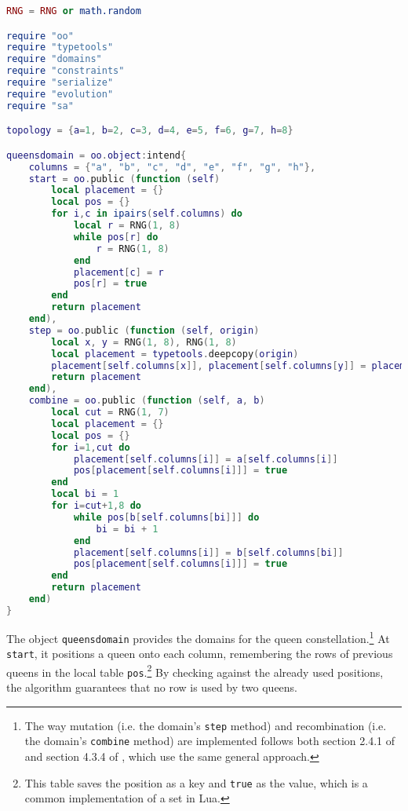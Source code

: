 \begin{appendices}
\begin{lstlisting}[language=lua, caption={The script \texttt{queens} (part 1)}, label=lst:queens1, name=lst:queens]
RNG = RNG or math.random

require "oo"
require "typetools"
require "domains"
require "constraints"
require "serialize"
require "evolution"
require "sa"

topology = {a=1, b=2, c=3, d=4, e=5, f=6, g=7, h=8}

queensdomain = oo.object:intend{
    columns = {"a", "b", "c", "d", "e", "f", "g", "h"},
    start = oo.public (function (self)
        local placement = {}
        local pos = {}
        for i,c in ipairs(self.columns) do
            local r = RNG(1, 8)
            while pos[r] do
                r = RNG(1, 8)
            end
            placement[c] = r
            pos[r] = true
        end
        return placement
    end),
    step = oo.public (function (self, origin)
        local x, y = RNG(1, 8), RNG(1, 8)
        local placement = typetools.deepcopy(origin)
        placement[self.columns[x]], placement[self.columns[y]] = placement[self.columns[y]], placement[self.columns[x]]
        return placement
    end),
    combine = oo.public (function (self, a, b)
        local cut = RNG(1, 7)
        local placement = {}
        local pos = {}
        for i=1,cut do
            placement[self.columns[i]] = a[self.columns[i]]
            pos[placement[self.columns[i]]] = true
        end
        local bi = 1
        for i=cut+1,8 do
            while pos[b[self.columns[bi]]] do
                bi = bi + 1
            end
            placement[self.columns[i]] = b[self.columns[bi]]
            pos[placement[self.columns[i]]] = true
        end
        return placement
    end)
}
\end{lstlisting}

The object \texttt{queensdomain} provides the domains for the queen constellation.\footnote{The way mutation (i.e. the domain's \texttt{step} method) and recombination (i.e. the domain's \texttt{combine} method) are implemented follows both section 2.4.1 of \cite{EibenSmith2007} and section 4.3.4 of \cite{RussellNorvig2003}, which use the same general approach.} At \texttt{start}, it positions a queen onto each column, remembering the rows of previous queens in the local table \texttt{pos}.\footnote{This table saves the position as a key and \texttt{true} as the value, which is a common implementation of a set in Lua.} By checking against the already used positions, the algorithm guarantees that no row is used by two queens.


\end{appendices}
